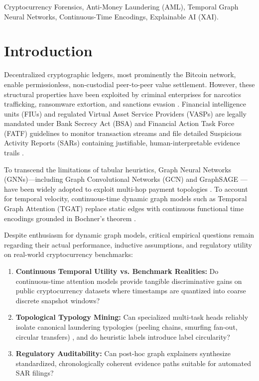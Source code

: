 \documentclass[conference]{IEEEtran}
\begin{document}
\begin{IEEEkeywords}
Cryptocurrency Forensics, Anti-Money Laundering (AML), Temporal Graph Neural Networks, Continuous-Time Encodings, Explainable AI (XAI).
\end{IEEEkeywords}

\section{Introduction}
Decentralized cryptographic ledgers, most prominently the Bitcoin network, enable permissionless, non-custodial peer-to-peer value settlement. However, these structural properties have been exploited by criminal enterprises for narcotics trafficking, ransomware extortion, and sanctions evasion \cite{weber2019elliptic, moser2013inquiry}. Financial intelligence units (FIUs) and regulated Virtual Asset Service Providers (VASPs) are legally mandated under Bank Secrecy Act (BSA) and Financial Action Task Force (FATF) guidelines to monitor transaction streams and file detailed Suspicious Activity Reports (SARs) containing justifiable, human-interpretable evidence trails \cite{fincen2019guidance, fatf2019guidance}.

To transcend the limitations of tabular heuristics, Graph Neural Networks (GNNs)—including Graph Convolutional Networks (GCN) \cite{kipf2017gcn} and GraphSAGE \cite{hamilton2017graphsage}—have been widely adopted to exploit multi-hop payment topologies \cite{weber2019elliptic, alarab2020competence}. To account for temporal velocity, continuous-time dynamic graph models such as Temporal Graph Attention (TGAT) \cite{xu2020tgat} replace static edges with continuous functional time encodings grounded in Bochner's theorem \cite{rahimi2007random, kazemi2019time2vec}. 

Despite enthusiasm for dynamic graph models, critical empirical questions remain regarding their actual performance, inductive assumptions, and regulatory utility on real-world cryptocurrency benchmarks:
\begin{enumerate}
    \item \textbf{Continuous Temporal Utility vs. Benchmark Realities:} Do continuous-time attention models provide tangible discriminative gains on public cryptocurrency datasets where timestamps are quantized into coarse discrete snapshot windows?
    \item \textbf{Topological Typology Mining:} Can specialized multi-task heads reliably isolate canonical laundering typologies (peeling chains, smurfing fan-out, circular transfers) \cite{meiklejohn2013fistful, wu2021mixing}, and do heuristic labels introduce label circularity?
    \item \textbf{Regulatory Auditability:} Can post-hoc graph explainers synthesize standardized, chronologically coherent evidence paths suitable for automated SAR filings?
\end{enumerate}
\end{document}
